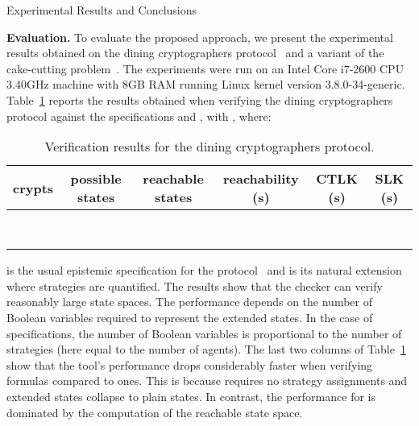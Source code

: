 




\begin{section}{Experimental Results and Conclusions}
	\label{sec:exprescon}

\textbf{Evaluation.}
To evaluate the proposed approach, we present the experimental results obtained
on the dining cryptographers protocol~\cite{Cha88,LQR09} and a variant of the
cake-cutting problem~\cite{ES84}.
The experiments were run on an Intel Core i7-2600 CPU 3.40GHz machine with 8GB
RAM running Linux kernel version 3.8.0-34-generic.
Table~\ref{tab:dining-cryptographers} reports the results obtained when
verifying the dining cryptographers protocol against the specifications
 and , with
, where:




\vspace{-2em}
\begin{table}
\centering
\caption{Verification results for the dining cryptographers protocol.}
\begin{tabular}{|c|c|c|c|c|c|}
\hline
 \textbf{crypts} & \textbf{possible states} & \textbf{reachable states}
& \textbf{reachability} (s) & \textbf{CTLK} (s) & \textbf{SLK} (s) \\ \hline
 &  &  &  &  &  \\ \hline
 &  &  &  &  &  \\ \hline
 &  &  &  &  &  \\ \hline
 &  &  &  &  &  \\ \hline
 &  &  &  &  &  \\ \hline
 &  &  &  &  & 
\\ \hline
 &  &  &  &  & 
\\ \hline
 &  &  &  &  & 
\\ \hline
\end{tabular}
\label{tab:dining-cryptographers}
\end{table}
\vspace{-1em}

 is the usual epistemic specification for the
protocol~\cite{MS04,LQR09} and  is its natural extension where
strategies are quantified.
The results show that the checker can verify reasonably large state spaces.
The performance depends on the number of Boolean variables required to represent
the extended states.
In the case of \SLK specifications, the number of Boolean variables is
proportional to the number of strategies (here equal to the number of agents).
The last two columns of Table~\ref{tab:dining-cryptographers} show that the
tool's performance drops considerably faster when verifying \SLK formulas
compared to \CTLK ones.
This is because \CTLK requires no strategy assignments and extended states
collapse to plain states.
In contrast, the performance for \CTLK is dominated by the computation of the
reachable state space.


\end{section}
